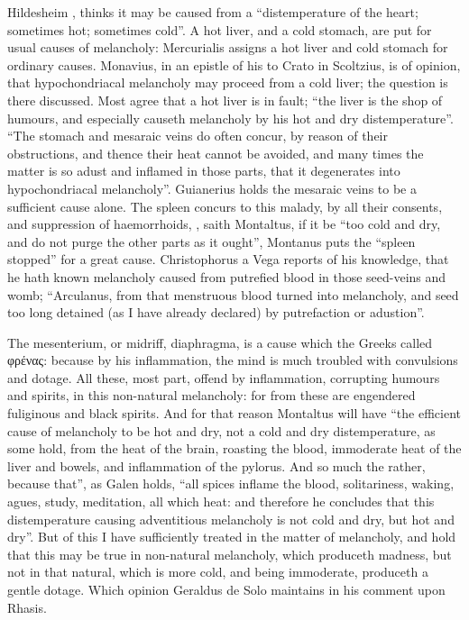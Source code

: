 Hildesheim , thinks it may be caused
from a \enquote{distemperature of the heart; sometimes hot;
sometimes cold}. A hot liver, and a cold stomach, are put for usual causes of
melancholy: Mercurialis  assigns a hot liver and cold stomach for ordinary causes.
Monavius, in an epistle of his to Crato in Scoltzius, is
of opinion, that hypochondriacal melancholy may proceed from a cold liver; the
question is there discussed. Most agree that a hot liver is in fault;
\enquote{the liver is the shop of humours, and especially causeth
melancholy by his hot and dry distemperature}. \enquote{The
stomach and mesaraic veins do often concur, by reason of their obstructions,
and thence their heat cannot be avoided, and many times the matter is so adust
and inflamed in those parts, that it degenerates into hypochondriacal
melancholy}. Guianerius  holds the
mesaraic veins to be a sufficient cause alone. The spleen
concurs to this malady, by all their consents, and suppression of haemorrhoids,
, saith Montaltus, if it be
\enquote{too cold and dry, and do not purge the other parts as it
ought},  Montanus puts the
\enquote{spleen stopped} for a great cause.
Christophorus a Vega reports of his knowledge, that he
hath known melancholy caused from putrefied blood in those seed-veins and womb;
\enquote{Arculanus, from that menstruous blood turned into
melancholy, and seed too long detained (as I have already declared) by
putrefaction or adustion}.

The mesenterium, or midriff, diaphragma, is a cause which the
Greeks called \textgreek{φρένας}: because by his
inflammation, the mind is much troubled with convulsions and dotage. All these,
most part, offend by inflammation, corrupting humours and spirits, in this
non-natural melancholy: for from these are engendered fuliginous and black
spirits. And for that reason Montaltus
 will have \enquote{the efficient cause
of melancholy to be hot and dry, not a cold and dry distemperature, as some
hold, from the heat of the brain, roasting the blood, immoderate heat of the
liver and bowels, and inflammation of the pylorus. And so much the rather,
because that}, as Galen holds, \enquote{all spices inflame the blood, solitariness,
waking, agues, study, meditation, all which heat: and therefore he concludes
that this distemperature causing adventitious melancholy is not cold and dry,
but hot and dry}. But of this I have sufficiently treated in the matter of
melancholy, and hold that this may be true in non-natural melancholy, which
produceth madness, but not in that natural, which is more cold, and being
immoderate, produceth a gentle dotage. Which opinion
Geraldus de Solo maintains in his comment upon Rhasis.

